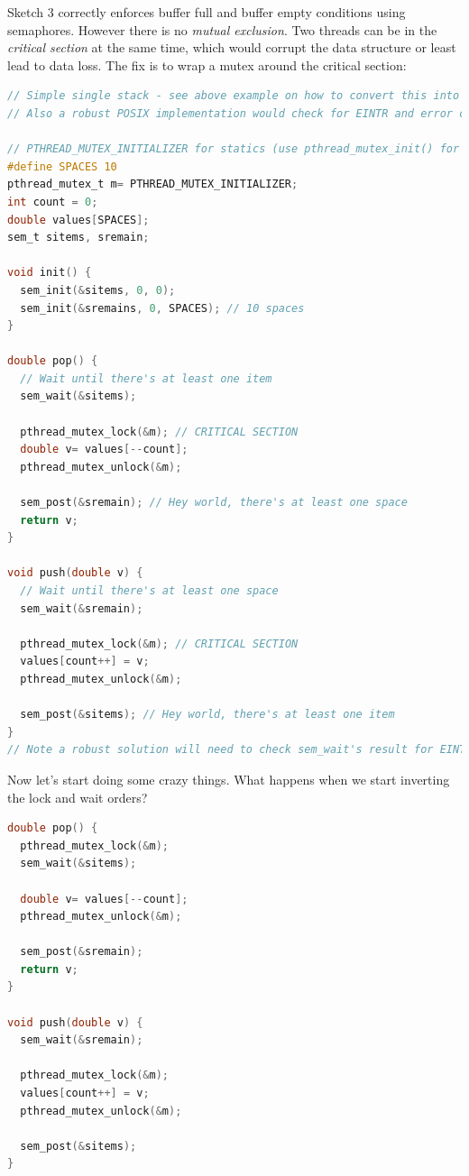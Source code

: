 Sketch 3 correctly enforces buffer full and buffer empty conditions using semaphores.
However there is no \emph{mutual exclusion}.
Two threads can be in the \emph{critical section} at the same time, which would corrupt the data structure or least lead to data loss.
The fix is to wrap a mutex around the critical section:

\begin{lstlisting}[language=C]
// Simple single stack - see above example on how to convert this into a multiple stacks.
// Also a robust POSIX implementation would check for EINTR and error codes of sem_wait.

// PTHREAD_MUTEX_INITIALIZER for statics (use pthread_mutex_init() for stack/heap memory)
#define SPACES 10
pthread_mutex_t m= PTHREAD_MUTEX_INITIALIZER;
int count = 0;
double values[SPACES];
sem_t sitems, sremain;

void init() {
  sem_init(&sitems, 0, 0);
  sem_init(&sremains, 0, SPACES); // 10 spaces
}

double pop() {
  // Wait until there's at least one item
  sem_wait(&sitems);

  pthread_mutex_lock(&m); // CRITICAL SECTION
  double v= values[--count];
  pthread_mutex_unlock(&m);

  sem_post(&sremain); // Hey world, there's at least one space
  return v;
}

void push(double v) {
  // Wait until there's at least one space
  sem_wait(&sremain);

  pthread_mutex_lock(&m); // CRITICAL SECTION
  values[count++] = v;
  pthread_mutex_unlock(&m);

  sem_post(&sitems); // Hey world, there's at least one item
}
// Note a robust solution will need to check sem_wait's result for EINTR (more about this later)
\end{lstlisting}

Now let's start doing some crazy things.
What happens when we start inverting the lock and wait orders?

\begin{lstlisting}[language=C]
double pop() {
  pthread_mutex_lock(&m);
  sem_wait(&sitems);

  double v= values[--count];
  pthread_mutex_unlock(&m);

  sem_post(&sremain);
  return v;
}

void push(double v) {
  sem_wait(&sremain);

  pthread_mutex_lock(&m);
  values[count++] = v;
  pthread_mutex_unlock(&m);

  sem_post(&sitems);
}
\end{lstlisting}

